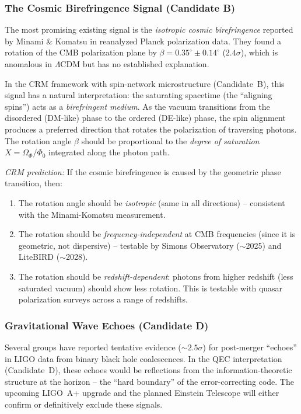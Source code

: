 \documentclass[aps,prd,twocolumn,superscriptaddress,nofootinbib]{revtex4-2}
\begin{document}
\subsubsection{The Cosmic Birefringence Signal (Candidate B)}

The most promising existing signal is the \textit{isotropic cosmic birefringence} reported by Minami \& Komatsu \cite{Minami2020} in reanalyzed Planck polarization data. They found a rotation of the CMB polarization plane by $\beta = 0.35^\circ \pm 0.14^\circ$ ($2.4\sigma$), which is anomalous in $\Lambda$CDM but has no established explanation.

In the CRM framework with spin-network microstructure (Candidate~B), this signal has a natural interpretation: the saturating spacetime (the ``aligning spins'') acts as a \textit{birefringent medium}. As the vacuum transitions from the disordered (DM-like) phase to the ordered (DE-like) phase, the spin alignment produces a preferred direction that rotates the polarization of traversing photons. The rotation angle $\beta$ should be proportional to the \textit{degree of saturation} $X = \Omega_\Phi/\Phi_0$ integrated along the photon path.

\textit{CRM prediction:} If the cosmic birefringence is caused by the geometric phase transition, then:
\begin{enumerate}
\item The rotation angle should be \textit{isotropic} (same in all directions) -- consistent with the Minami-Komatsu measurement.
\item The rotation should be \textit{frequency-independent} at CMB frequencies (since it is geometric, not dispersive) -- testable by Simons Observatory ($\sim$2025) and LiteBIRD ($\sim$2028).
\item The rotation should be \textit{redshift-dependent}: photons from higher redshift (less saturated vacuum) should show less rotation. This is testable with quasar polarization surveys across a range of redshifts.
\end{enumerate}

\subsubsection{Gravitational Wave Echoes (Candidate D)}

Several groups \cite{Abedi2017} have reported tentative evidence ($\sim2.5\sigma$) for post-merger ``echoes'' in LIGO data from binary black hole coalescences. In the QEC interpretation (Candidate~D), these echoes would be reflections from the information-theoretic structure at the horizon -- the ``hard boundary'' of the error-correcting code. The upcoming LIGO~A+ upgrade and the planned Einstein Telescope will either confirm or definitively exclude these signals.
\end{document}

